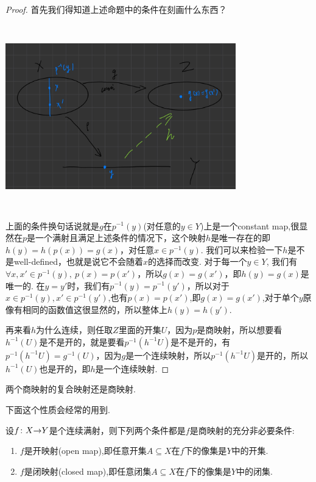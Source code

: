 \begin{proof}
首先我们得知道上述命题中的条件在刻画什么东西？
\begin{center}
\includegraphics[width=10cm, height=8cm]{images/universal_property_of_quotient_map.JPG}
\end{center}
上面的条件换句话说就是$g$在$p^{-1}(y)$(对任意的$y \in Y$)上是一个constant map,很显然在$p$是一个满射且满足上述条件的情况下，这个映射$h$是唯一存在的即$h(y)=h(p(x))=g(x)$，对任意$x \in p^{-1}(y)$. 我们可以来检验一下$h$是不是well-defined，也就是说它不会随着$x$的选择而改变. 对于每一个$y \in Y$, 我们有$\forall x,x' \in p^{-1}(y),\ p(x)=p(x')$，所以$g(x)=g(x')$，即$h(y)=g(x)$是唯一的. 在$y = y'$时，我们有$p^{-1}(y) = p^{-1}(y')$，所以对于$x \in p^{-1}(y),x' \in p^{-1}(y')$,也有$p(x)=p(x')$,即$g(x)=g(x')$,对于单个$y$原像有相同的函数值这很显然的，所以整体上$h(y)=h(y')$.

再来看$h$为什么连续，则任取$Z$里面的开集$U$，因为$p$是商映射，所以想要看$h^{-1}(U)$是不是开的，就是要看$p^{-1}(h^{-1}{U})$是不是开的，有$p^{-1}(h^{-1}{U}) = g^{-1}(U)$，因为$g$是一个连续映射，所以$p^{-1}(h^{-1}{U})$是开的，所以$h^{-1}(U)$也是开的，即$h$是一个连续映射.
\end{proof}


\begin{proposition}
两个商映射的复合映射还是商映射.
\end{proposition}


下面这个性质会经常的用到.

\begin{proposition}
设${f}\colon{X}{\to}{Y}$是个连续满射，则下列两个条件都是$f$是商映射的充分非必要条件:
\begin{enumerate}
	\item $f$是开映射(open map),即任意开集$A \subseteq X$在$f$下的像集是$Y$中的开集.
	\item $f$是闭映射(closed map),即任意闭集$A \subseteq X$在$f$下的像集是$Y$中的闭集.
\end{enumerate}
\end{proposition}

